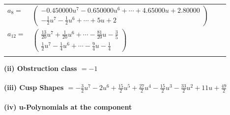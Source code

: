 \documentclass[1p]{elsarticle_modified}
\theoremstyle{definition}
\begin{document}
\begin{tabular}{m{7pt} m{180pt} m{7pt} m{180pt} }
\flushright $a_{8}=$&$\begin{pmatrix}-0.450000 u^{7}-0.650000 u^{6}+\cdots+4.65000 u+2.80000\\-\frac{1}{2} u^7-\frac{1}{2} u^6+\cdots+5 u+2\end{pmatrix}$ \\
\flushright $a_{12}=$&$\begin{pmatrix}\frac{13}{20} u^7+\frac{1}{20} u^6+\cdots-\frac{81}{20} u-\frac{3}{5}\\\frac{1}{2} u^7-\frac{1}{4} u^6+\cdots-\frac{9}{4} u-\frac{1}{4}\end{pmatrix}$\\&\end{tabular}
\flushleft \textbf{(ii) Obstruction class $= -1$}\\~\\
\flushleft \textbf{(iii) Cusp Shapes $= -\frac{3}{2} u^7-2 u^6+\frac{15}{2} u^5+\frac{27}{2} u^4-\frac{15}{2} u^3-\frac{33}{2} u^2+11 u+\frac{49}{2}$}\\~\\
\newpage\renewcommand{\arraystretch}{1}
\flushleft \textbf{(iv) u-Polynomials at the component}\newline \\
\end{document}
